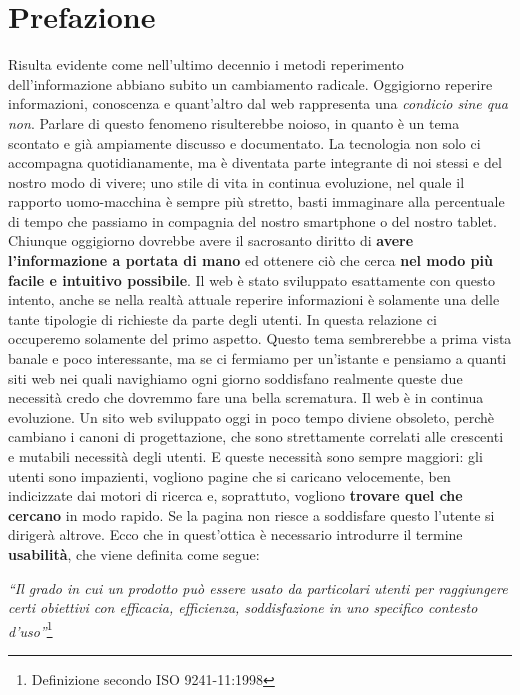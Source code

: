 \section*{Prefazione}

Risulta evidente come nell'ultimo decennio i metodi reperimento dell'informazione abbiano subito un cambiamento radicale. Oggigiorno reperire informazioni, conoscenza e quant'altro dal web rappresenta una \textit{condicio sine qua non}. Parlare di questo fenomeno risulterebbe noioso, in quanto è un tema scontato e già ampiamente discusso e documentato. La tecnologia non solo ci accompagna quotidianamente, ma è diventata parte integrante di noi stessi e del nostro modo di vivere; uno stile di vita in continua evoluzione, nel quale il rapporto uomo-macchina è sempre più stretto, basti immaginare alla percentuale di tempo che passiamo in compagnia del nostro smartphone o del nostro tablet.
\linebreak
\linebreak
Chiunque oggigiorno dovrebbe avere il sacrosanto diritto di \textbf{avere l'informazione a portata di mano} ed ottenere ciò che cerca \textbf{nel modo più facile e intuitivo possibile}. Il web è stato sviluppato esattamente con questo intento, anche se nella realtà attuale reperire informazioni è solamente una delle tante tipologie di richieste da parte degli utenti. In questa relazione ci occuperemo solamente del primo aspetto. Questo tema sembrerebbe a prima vista banale e poco interessante, ma se ci fermiamo per un'istante e pensiamo a quanti siti web nei quali navighiamo ogni giorno soddisfano realmente queste due necessità credo che dovremmo fare una bella scrematura.
\linebreak
\linebreak
Il web è in continua evoluzione. Un sito web sviluppato oggi in poco tempo diviene obsoleto, perchè cambiano i canoni di progettazione, che sono strettamente correlati alle crescenti e mutabili necessità degli utenti. E queste necessità sono sempre maggiori: gli utenti sono impazienti, vogliono pagine che si caricano velocemente, ben indicizzate dai motori di ricerca e, soprattuto, vogliono \textbf{trovare quel che cercano} in modo rapido. Se la pagina non riesce a soddisfare questo l'utente si dirigerà altrove. Ecco che in quest'ottica è necessario introdurre il termine \textbf{usabilità}, che viene definita come segue:

\begin{center}

\textit{``Il grado in cui un prodotto può essere usato da particolari utenti per raggiungere certi obiettivi con efficacia, efficienza, soddisfazione in uno specifico contesto d’uso''}\footnote{Definizione secondo ISO 9241-11:1998}

\end{center} 

